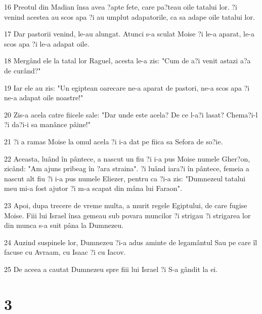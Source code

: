 \par 16 Preotul din Madian însa avea ?apte fete, care pa?teau oile tatalui lor. ?i venind acestea au scos apa ?i au umplut adapatorile, ca sa adape oile tatalui lor.
\par 17 Dar pastorii venind, le-au alungat. Atunci s-a sculat Moise ?i le-a aparat, le-a scos apa ?i le-a adapat oile.
\par 18 Mergând ele la tatal lor Raguel, acesta le-a zis: "Cum de a?i venit astazi a?a de curând?"
\par 19 Iar ele au zis: "Un egiptean oarecare ne-a aparat de pastori, ne-a scos apa ?i ne-a adapat oile noastre!"
\par 20 Zis-a acela catre fiicele sale: "Dar unde este acela? De ce l-a?i lasat? Chema?i-l ?i da?i-i sa manânce pâine!"
\par 21 ?i a ramas Moise la omul acela ?i i-a dat pe fiica sa Sefora de so?ie.
\par 22 Aceasta, luând în pântece, a nascut un fiu ?i i-a pus Moise numele Gher?on, zicând: "Am ajuns pribeag în ?ara straina". ?i luând iara?i în pântece, femeia a nascut alt fiu ?i i-a pus numele Eliezer, pentru ca ?i-a zis: "Dumnezeul tatalui meu mi-a fost ajutor ?i m-a scapat din mâna lui Faraon".
\par 23 Apoi, dupa trecere de vreme multa, a murit regele Egiptului, de care fugise Moise. Fiii lui Israel însa gemeau sub povara muncilor ?i strigau ?i strigarea lor din munca s-a suit pâna la Dumnezeu.
\par 24 Auzind suspinele lor, Dumnezeu ?i-a adus aminte de legamântul Sau pe care îl facuse cu Avraam, cu Isaac ?i cu Iacov.
\par 25 De aceea a cautat Dumnezeu spre fiii lui Israel ?i S-a gândit la ei.

\chapter{3}

